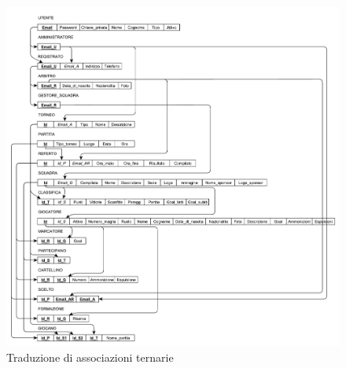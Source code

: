 	\begin{figure}[h]
		\centering
		\includegraphics[width=1\textwidth]
		{immagini/traduzione-associazioni-ternarie}
		
		\caption{Traduzione di associazioni ternarie}
		\label{f:trad-assoc}
	\end{figure}